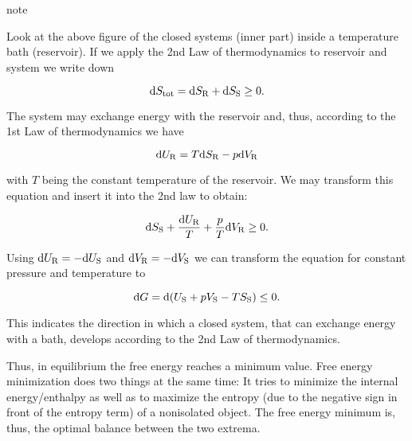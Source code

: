 \documentclass[letterpaper,10pt,english]{sphinxmanual}
\begin{document}
\begin{sphinxadmonition}{note}{}\unskip
\sphinxAtStartPar
{}

\sphinxAtStartPar
Look at the above figure of the closed systems (inner part) inside a temperature bath (reservoir). If we apply the 2nd Law of thermodynamics to reservoir and system we write down

\sphinxAtStartPar
\begin{equation}
\mathrm{d}S_{\rm tot}=\mathrm{d}S_{\rm R}+ \mathrm{d}S_{\rm S}\ge 0.
\end{equation}

\sphinxAtStartPar
The system may exchange energy with the reservoir and, thus, according to the 1st Law of thermodynamics we have

\sphinxAtStartPar
\begin{equation}
\mathrm{d}U_{\rm R}=T\mathrm{d}S_{\rm R}-p \mathrm{d}V_{\rm R}
\end{equation}

\sphinxAtStartPar
with \(T\) being the constant temperature of the reservoir. We may transform this equation and insert it into the 2nd law to obtain:

\sphinxAtStartPar
\begin{equation}
\mathrm{d}S_{\rm S}+\frac{\mathrm{d}U_{\rm R}}{T}+\frac{p}{T}\mathrm{d}V_{\rm R}\ge 0.
\end{equation}

\sphinxAtStartPar
Using \(\mathrm{d}U_{\rm R}=-\mathrm{d}U_{\rm S}\) and \(\mathrm{d}V_{\rm R}=-\mathrm{d}V_{\rm S}\) we can transform the equation for constant pressure and temperature to

\sphinxAtStartPar
\begin{equation}
\mathrm{d}G=\mathrm{d}(U_{\rm S}+pV_{\rm S}-TS_{\rm S})\le 0.
\end{equation}

\sphinxAtStartPar
This indicates the direction in which a closed system, that can exchange energy with a bath, develops according to the 2nd Law of thermodynamics.

\sphinxAtStartPar
{}

\sphinxAtStartPar
Thus, in equilibrium the free energy reaches a minimum value. Free energy minimization does two things at the same time: It tries to minimize the internal energy/enthalpy as well as to maximize the entropy (due to the negative sign in front of the entropy term) of a non\sphinxhyphen{}isolated object. The free energy minimum is, thus, the optimal balance between the two extrema.
\end{sphinxadmonition}
\end{document}
